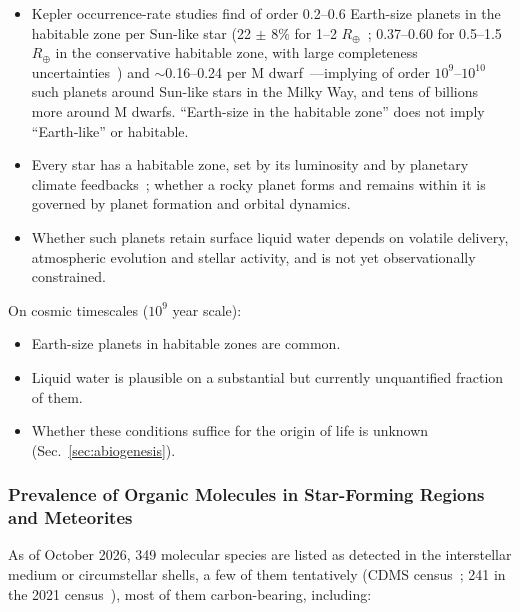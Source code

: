 \documentclass[aps,prd,twocolumn,superscriptaddress,nofootinbib]{revtex4-2}
\begin{document}
\begin{itemize}
  \item Kepler occurrence-rate studies find of order 0.2--0.6 Earth-size planets in the habitable zone per Sun-like star (22 $\pm$ 8\% for 1--2 $R_{\oplus}$~\cite{Petigura2013}; 0.37--0.60 for 0.5--1.5 $R_{\oplus}$ in the conservative habitable zone, with large completeness uncertainties~\cite{Bryson2021}) and ${\sim}$0.16--0.24 per M dwarf~\cite{Dressing2015}---implying of order $10^{9}$--$10^{10}$ such planets around Sun-like stars in the Milky Way, and tens of billions more around M dwarfs. ``Earth-size in the habitable zone'' does not imply ``Earth-like'' or habitable.
  \item Every star has a habitable zone, set by its luminosity and by planetary climate feedbacks~\cite{Kopparapu2013}; whether a rocky planet forms and remains within it is governed by planet formation and orbital dynamics.
  \item Whether such planets retain surface liquid water depends on volatile delivery, atmospheric evolution and stellar activity, and is not yet observationally constrained.
\end{itemize}

On cosmic timescales ($10^{9}$ year scale):

\begin{itemize}
  \item Earth-size planets in habitable zones are common.
  \item Liquid water is plausible on a substantial but currently unquantified fraction of them.
  \item Whether these conditions suffice for the origin of life is unknown (Sec.~\ref{sec:abiogenesis}).
\end{itemize}

\subsubsection{Prevalence of Organic Molecules in Star-Forming Regions and Meteorites}\label{sec:organic-molecules}

As of October 2026, 349 molecular species are listed as detected in the interstellar medium or circumstellar shells, a few of them tentatively (CDMS census~\cite{CDMS2026}; 241 in the 2021 census~\cite{McGuire2022}), most of them carbon-bearing, including:
\end{document}

